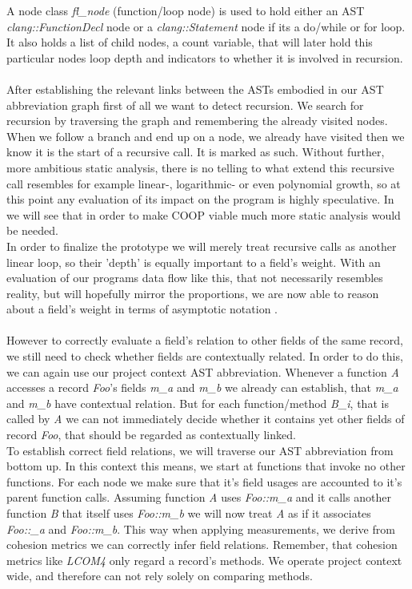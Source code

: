 A node class \textit{fl\_node} (function/loop node) is used to hold either an AST \textit{clang::FunctionDecl} node or a \textit{clang::Statement} node if its a do/while or for loop. It also holds a list of child nodes, a count variable, that will later hold this particular nodes loop depth and indicators to whether it is involved in recursion.\\\\
After establishing the relevant links between the ASTs embodied in our AST abbreviation graph first of all we want to detect recursion. We search for recursion by traversing the graph and remembering the already visited nodes. When we follow a branch and end up on a node, we already have visited then we know it is the start of a recursive call. It is marked as such. Without further, more ambitious static analysis, there is no telling to what extend this recursive call resembles for example linear-, logarithmic- or even polynomial growth, so at this point any evaluation of its impact on the program is highly speculative. In  we will see that in order to make COOP viable much more static analysis would be needed.\\
In order to finalize the prototype we will merely treat recursive calls as another linear loop, so their 'depth' is equally important to a field's weight. With an evaluation of our programs data flow like this, that not necessarily resembles reality, but will hopefully mirror the proportions, we are now able to reason about a field's weight in terms of asymptotic notation .\\\\
However to correctly evaluate a field's relation to other fields of the same record, we still need to check whether fields are contextually related. In order to do this, we can again use our project context AST abbreviation. Whenever a function \textit{A} accesses a record \textit{Foo}'s fields \textit{m\_a} and \textit{m\_b} we already can establish, that \textit{m\_a} and \textit{m\_b} have contextual relation. But for each function/method \textit{B\_i}, that is called by \textit{A} we can not immediately decide whether it contains yet other fields of record \textit{Foo}, that should be regarded as contextually linked.\\
To establish correct field relations, we will traverse our AST abbreviation from bottom up. In this context this means, we start at functions that invoke no other functions. For each node we make sure that it's field usages are accounted to it's parent function calls. Assuming function \textit{A} uses \textit{Foo::m\_a} and it calls another function \textit{B} that itself uses \textit{Foo::m\_b} we will now treat \textit{A} as if it associates \textit{Foo::\_a} and \textit{Foo::m\_b}. This way when applying measurements, we derive from cohesion metrics  we can correctly infer field relations. Remember, that cohesion metrics like \textit{LCOM4} only regard a record's methods. We operate project context wide, and therefore can not rely solely on comparing methods.\\
